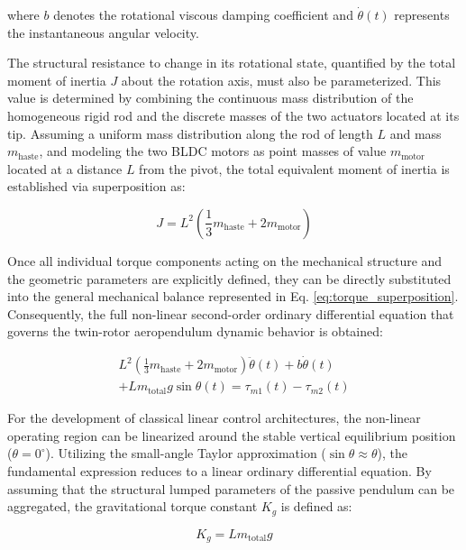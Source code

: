 \documentclass[pdflatex,sn-mathphys-num,iicol]{sn-jnl}
\theoremstyle{thmstyleone}%
\theoremstyle{thmstyletwo}%
\theoremstyle{thmstylethree}%
\begin{document}
\noindent where $b$ denotes the rotational viscous damping coefficient and $\dot{\theta}(t)$ represents the instantaneous angular velocity.

The structural resistance to change in its rotational state, quantified by the total moment of inertia $J$ about the rotation axis, must also be parameterized. This value is determined by combining the continuous mass distribution of the homogeneous rigid rod and the discrete masses of the two actuators located at its tip. Assuming a uniform mass distribution along the rod of length $L$ and mass $m_{\text{haste}}$, and modeling the two BLDC motors as point masses of value $m_{\text{motor}}$ located at a distance $L$ from the pivot, the total equivalent moment of inertia is established via superposition as:

\begin{equation}
J = L^2 \left( \frac{1}{3}m_{\text{haste}} + 2m_{\text{motor}} \right)
\label{eq:i_total}
\end{equation}

Once all individual torque components acting on the mechanical structure and the geometric parameters are explicitly defined, they can be directly substituted into the general mechanical balance represented in Eq. \eqref{eq:torque_superposition}. Consequently, the full non-linear second-order ordinary differential equation that governs the twin-rotor aeropendulum dynamic behavior is obtained:

\begin{equation}
\begin{split}
L^{2}\left(\frac{1}{3}m_{\text{haste}}+2m_{\text{motor}}\right)\ddot{\theta}(t) + b\dot{\theta}(t) \\
+ Lm_{\text{total}}g\sin\theta(t) = \tau_{m1}(t) - \tau_{m2}(t)
\end{split}
\label{eq:nonlinear_ode}
\end{equation}

For the development of classical linear control architectures, the non-linear operating region can be linearized around the stable vertical equilibrium position ($\theta = 0^\circ$). Utilizing the small-angle Taylor approximation ($\sin\theta \approx \theta$), the fundamental expression reduces to a linear ordinary differential equation. By assuming that the structural lumped parameters of the passive pendulum can be aggregated, the gravitational torque constant $K_g$ is defined as:

\begin{equation}
K_g = L m_{\text{total}} g
\label{eq:const_Kg}
\end{equation}
\end{document}
